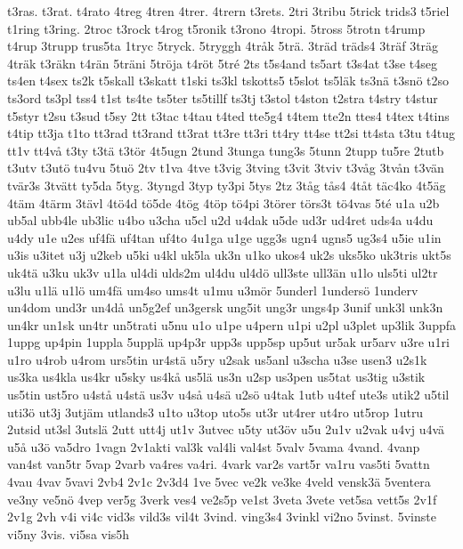 {{t3ras.
t3rat.
t4rato
4treg
4tren
4trer.
4trern
t3rets.
2tri
3tribu
5trick
trids3
t5riel
t1ring
t3ring.
2troc
t3rock
t4rog
t5ronik
t3rono
4tropi.
5tross
5trotn
t4rump
t4rup
3trupp
trus5ta
1tryc
5tryck.
5tryggh
4tr^^e5k
5tr^^e4.
3tr^^e4d
tr^^e4ds4
3tr^^e4f
3tr^^e4g
4tr^^e4k
t3r^^e4kn
t4r^^e4n
5tr^^e4ni
5tr^^f6ja
t4r^^f6t
5tr^^e9
2ts
t5s4and
ts5art
t3s4at
t3se
t4seg
ts4en
t4sex
ts2k
t5skall
t3skatt
t1ski
ts3kl
tskotts5
t5slot
ts5l^^e4k
ts3n^^e4
t3sn^^f6
t2so
ts3ord
ts3pl
tss4
t1st
ts4te
ts5ter
ts5tillf
ts3tj
t3stol
t4ston
t2stra
t4stry
t4stur
t5styr
t2su
t3sud
t5sy
2tt
t3tac
t4tau
t4ted
tte5g4
t4tem
tte2n
ttes4
t4tex
t4tins
t4tip
tt3ja
t1to
tt3rad
tt3rand
tt3rat
tt3re
tt3ri
tt4ry
tt4se
tt2si
tt4sta
t3tu
t4tug
tt1v
tt4v^^e5
t3ty
t3t^^e4
t3t^^f6r
4t5ugn
2tund
3tunga
tung3s
5tunn
2tupp
tu5re
2tutb
t3utv
t3ut^^f6
tu4vu
5tu^^f6
2tv
t1va
4tve
t3vig
3tving
t3vit
3tviv
t3v^^e5g
3tv^^e5n
t3v^^e4n
tv^^e4r3s
3tv^^e4tt
ty5da
5tyg.
3tyngd
3typ
ty3pi
5tys
2tz
3t^^e5g
t^^e5s4
4t^^e5t
t^^e4c4ko
4t5^^e4g
4t^^e4m
4t^^e4rm
3t^^e4vl
4t^^f64d
t^^f65de
4t^^f6g
4t^^f6p
t^^f64pi
3t^^f6rer
t^^f6rs3t
t^^f64vas
5t^^e9
u1a
u2b
ub5al
ubb4le
ub3lic
u4bo
u3cha
u5cl
u2d
u4dak
u5de
ud3r
ud4ret
uds4a
u4du
u4dy
u1e
u2es
uf4f^^e4
uf4tan
uf4to
4u1ga
u1ge
ugg3s
ugn4
ugns5
ug3s4
u5ie
u1in
u3is
u3itet
u3j
u2keb
u5ki
u4kl
uk5la
uk3n
u1ko
ukos4
uk2s
uks5ko
uk3tris
ukt5s
uk4t^^e4
u3ku
uk3v
u1la
ul4di
ulds2m
ul4du
ul4d^^f6
ull3ste
ull3^^e4n
u1lo
uls5ti
ul2tr
u3lu
u1l^^e4
u1l^^f6
um4f^^e4
um4so
ums4t
u1mu
u3m^^f6r
5underl
1unders^^f6
1underv
un4dom
und3r
un4d^^e5
un5g2ef
un3gersk
ung5it
ung3r
ungs4p
3unif
unk3l
unk3n
un4kr
un1sk
un4tr
un5trati
u5nu
u1o
u1pe
u4pern
u1pi
u2pl
u3plet
up3lik
3uppfa
1uppg
up4pin
1uppla
5uppl^^e4
up4p3r
upp3s
upp5sp
up5ut
ur5ak
ur5arv
u3re
u1ri
u1ro
u4rob
u4rom
urs5tin
ur4st^^e4
u5ry
u2sak
us5anl
u3scha
u3se
usen3
u2s1k
us3ka
us4kla
us4kr
u5sky
us4k^^e5
us5l^^e4
us3n
u2sp
us3pen
us5tat
us3tig
u3stik
us5tin
ust5ro
u4st^^e5
u4st^^e4
us3v
u4s^^e5
u4s^^e4
u2s^^f6
u4tak
1utb
u4tef
ute3s
utik2
u5til
uti3^^f6
ut3j
3utj^^e4m
utlands3
u1to
u3top
uto5s
ut3r
ut4rer
ut4ro
ut5rop
1utru
2utsid
ut3sl
3utsl^^e4
2utt
utt4j
ut1v
3utvec
u5ty
ut3^^f6v
u5u
2u1v
u2vak
u4vj
u4v^^e4
u5^^e5
u3^^f6
va5dro
1vagn
2v1akti
val3k
val4li
val4st
5valv
5vama
4vand.
4vanp
van4st
van5tr
5vap
2varb
va4res
va4ri.
4vark
var2s
vart5r
va1ru
vas5ti
5vattn
4vau
4vav
5vavi
2vb4
2v1c
2v3d4
1ve
5vec
ve2k
ve3ke
4veld
vensk3^^e4
5ventera
ve3ny
ve5n^^f6
4vep
ver5g
3verk
ves4
ve2s5p
ve1st
3veta
3vete
vet5sa
vett5s
2v1f
2v1g
2vh
v4i
vi4c
vid3s
vild3s
vil4t
3vind.
ving3s4
3vinkl
vi2no
5vinst.
5vinste
vi5ny
3vis.
vi5sa
vis5h
}}
